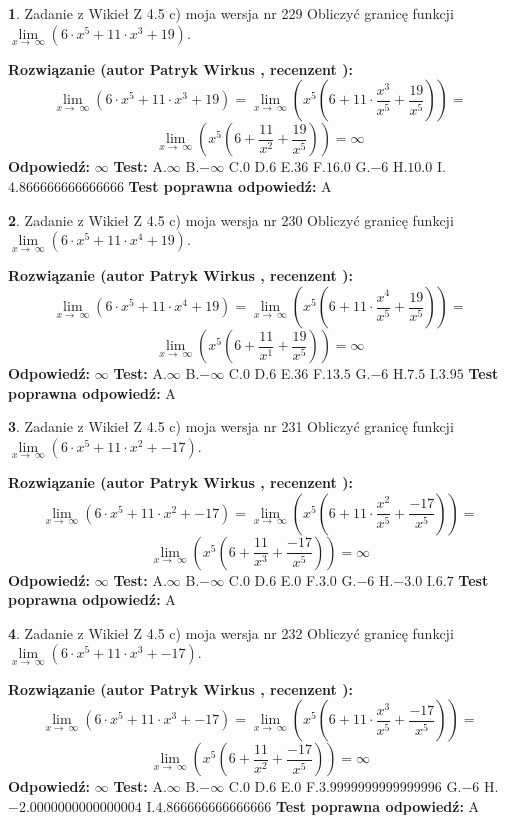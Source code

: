\documentclass[12pt, a4paper]{article}
\theoremstyle{definition} %
\newtheorem{zad}{}
\newcommand{\zadStart}[1]{\begin{zad}#1\newline}
\newcommand{\zadStop}{\end{zad}}
\newcommand{\rozwStart}[2]{\noindent \textbf{Rozwiązanie (autor #1 , recenzent #2): }\newline}
\newcommand{\rozwStop}{\newline}
\newcommand{\odpStart}{\noindent \textbf{Odpowiedź:}\newline}
\newcommand{\odpStop}{\newline}
\newcommand{\testStart}{\noindent \textbf{Test:}\newline}
\newcommand{\testStop}{\newline}
\newcommand{\kluczStart}{\noindent \textbf{Test poprawna odpowiedź:}\newline}
\newcommand{\kluczStop}{\newline}
\begin{document}
\zadStart{Zadanie z Wikieł Z 4.5 c) moja wersja nr 229}
Obliczyć granicę funkcji  $\lim\limits_{x\to\ \infty}(6 \cdot x^{5}+11 \cdot x^{3}+19)$.
\zadStop
\rozwStart{Patryk Wirkus}{}
$$\lim\limits_{x\to\ \infty}(6 \cdot x^{5}+11 \cdot x^{3}+19) = \lim\limits_{x\to\ \infty}(x^{5}(6 +11 \cdot \frac{x^{3}}{x^{5}}+\frac{19}{x^{5}})) =$$ $$\lim\limits_{x\to\ \infty}(x^{5}(6 +\frac{11}{x^{2}}+\frac{19}{x^{5}})) =\infty$$
\rozwStop
\odpStart
$\infty$
\odpStop
\testStart
A.$\infty$ B.$-\infty$ C.$0$ D.$6$ E.$36$
F.$16.0$ G.$-6$
H.$10.0$
I.$4.866666666666666$
\testStop
\kluczStart
A
\kluczStop



\zadStart{Zadanie z Wikieł Z 4.5 c) moja wersja nr 230}
Obliczyć granicę funkcji  $\lim\limits_{x\to\ \infty}(6 \cdot x^{5}+11 \cdot x^{4}+19)$.
\zadStop
\rozwStart{Patryk Wirkus}{}
$$\lim\limits_{x\to\ \infty}(6 \cdot x^{5}+11 \cdot x^{4}+19) = \lim\limits_{x\to\ \infty}(x^{5}(6 +11 \cdot \frac{x^{4}}{x^{5}}+\frac{19}{x^{5}})) =$$ $$\lim\limits_{x\to\ \infty}(x^{5}(6 +\frac{11}{x^{1}}+\frac{19}{x^{5}})) =\infty$$
\rozwStop
\odpStart
$\infty$
\odpStop
\testStart
A.$\infty$ B.$-\infty$ C.$0$ D.$6$ E.$36$
F.$13.5$ G.$-6$
H.$7.5$
I.$3.95$
\testStop
\kluczStart
A
\kluczStop



\zadStart{Zadanie z Wikieł Z 4.5 c) moja wersja nr 231}
Obliczyć granicę funkcji  $\lim\limits_{x\to\ \infty}(6 \cdot x^{5}+11 \cdot x^{2}+-17)$.
\zadStop
\rozwStart{Patryk Wirkus}{}
$$\lim\limits_{x\to\ \infty}(6 \cdot x^{5}+11 \cdot x^{2}+-17) = \lim\limits_{x\to\ \infty}(x^{5}(6 +11 \cdot \frac{x^{2}}{x^{5}}+\frac{-17}{x^{5}})) =$$ $$\lim\limits_{x\to\ \infty}(x^{5}(6 +\frac{11}{x^{3}}+\frac{-17}{x^{5}})) =\infty$$
\rozwStop
\odpStart
$\infty$
\odpStop
\testStart
A.$\infty$ B.$-\infty$ C.$0$ D.$6$ E.$0$
F.$3.0$ G.$-6$
H.$-3.0$
I.$6.7$
\testStop
\kluczStart
A
\kluczStop



\zadStart{Zadanie z Wikieł Z 4.5 c) moja wersja nr 232}
Obliczyć granicę funkcji  $\lim\limits_{x\to\ \infty}(6 \cdot x^{5}+11 \cdot x^{3}+-17)$.
\zadStop
\rozwStart{Patryk Wirkus}{}
$$\lim\limits_{x\to\ \infty}(6 \cdot x^{5}+11 \cdot x^{3}+-17) = \lim\limits_{x\to\ \infty}(x^{5}(6 +11 \cdot \frac{x^{3}}{x^{5}}+\frac{-17}{x^{5}})) =$$ $$\lim\limits_{x\to\ \infty}(x^{5}(6 +\frac{11}{x^{2}}+\frac{-17}{x^{5}})) =\infty$$
\rozwStop
\odpStart
$\infty$
\odpStop
\testStart
A.$\infty$ B.$-\infty$ C.$0$ D.$6$ E.$0$
F.$3.9999999999999996$ G.$-6$
H.$-2.0000000000000004$
I.$4.866666666666666$
\testStop
\kluczStart
A
\kluczStop
\end{document}
